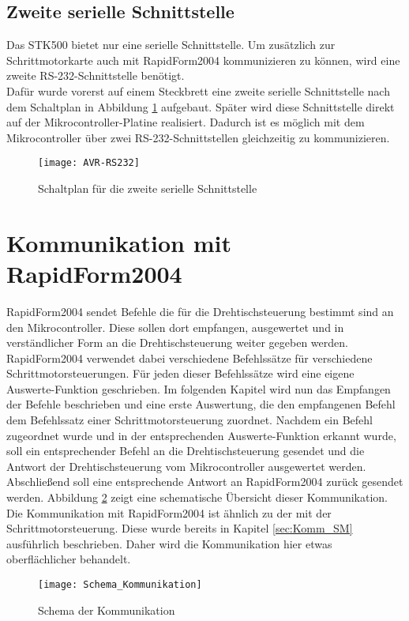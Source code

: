 \subsection{Zweite serielle Schnittstelle}
Das STK500 bietet nur eine serielle Schnittstelle. Um zusätzlich zur Schrittmotorkarte auch mit RapidForm2004 kommunizieren zu können, wird eine zweite RS-232-Schnittstelle benötigt.\\
Dafür wurde vorerst auf einem Steckbrett eine zweite serielle Schnittstelle nach dem Schaltplan in Abbildung \ref{fig:MAX232} aufgebaut. Später wird diese Schnittstelle direkt auf der Mikrocontroller-Platine realisiert.
Dadurch ist es möglich mit dem Mikrocontroller über zwei RS-232-Schnittstellen gleichzeitig zu kommunizieren.
\begin{figure}[h]
\centering
\texttt{[image: AVR-RS232]}
\caption{Schaltplan für die zweite serielle Schnittstelle
\cite{uC:RS232}}
\label{fig:MAX232}
\end{figure}

\section{Kommunikation mit RapidForm2004}
\label{sec:Komm_RF2004}
RapidForm2004 sendet Befehle die für die Drehtischsteuerung bestimmt sind an den Mikrocontroller. Diese sollen dort empfangen, ausgewertet und in verständlicher Form an die Drehtischsteuerung weiter gegeben werden. RapidForm2004 verwendet dabei verschiedene Befehlssätze für verschiedene Schrittmotorsteuerungen. Für jeden dieser Befehlssätze wird eine eigene Auswerte-Funktion geschrieben. Im folgenden Kapitel wird nun das Empfangen der Befehle beschrieben und eine erste Auswertung, die den empfangenen Befehl dem Befehlssatz einer Schrittmotorsteuerung zuordnet. 
Nachdem ein Befehl zugeordnet wurde und in der entsprechenden Auswerte-Funktion erkannt wurde, soll ein entsprechender Befehl an die Drehtischsteuerung gesendet und die Antwort der Drehtischsteuerung vom Mikrocontroller ausgewertet werden. Abschließend soll eine entsprechende Antwort an RapidForm2004 zurück gesendet werden. Abbildung \ref{fig:Schema_Komm} zeigt eine schematische Übersicht dieser Kommunikation.\\
Die Kommunikation mit RapidForm2004 ist ähnlich zu der mit der Schrittmotorsteuerung. Diese wurde bereits in Kapitel \ref{sec:Komm_SM} ausführlich beschrieben. Daher wird die Kommunikation hier etwas oberflächlicher behandelt.
\begin{figure}[h]
\centering
\texttt{[image: Schema\_Kommunikation]}
\caption{Schema der Kommunikation}
\label{fig:Schema_Komm}
\end{figure}

